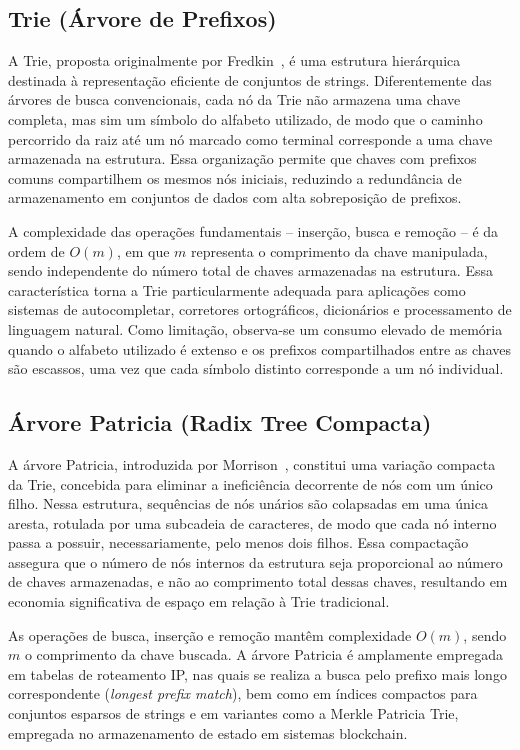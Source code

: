 \documentclass[conference]{IEEEtran}
\begin{document}
\subsection{Trie (Árvore de Prefixos)}

A Trie, proposta originalmente por Fredkin~\cite{fredkin1960}, é uma estrutura hierárquica destinada à representação eficiente de conjuntos de strings. Diferentemente das árvores de busca convencionais, cada nó da Trie não armazena uma chave completa, mas sim um símbolo do alfabeto utilizado, de modo que o caminho percorrido da raiz até um nó marcado como terminal corresponde a uma chave armazenada na estrutura. Essa organização permite que chaves com prefixos comuns compartilhem os mesmos nós iniciais, reduzindo a redundância de armazenamento em conjuntos de dados com alta sobreposição de prefixos.

A complexidade das operações fundamentais -- inserção, busca e remoção -- é da ordem de $O(m)$, em que $m$ representa o comprimento da chave manipulada, sendo independente do número total de chaves armazenadas na estrutura. Essa característica torna a Trie particularmente adequada para aplicações como sistemas de autocompletar, corretores ortográficos, dicionários e processamento de linguagem natural. Como limitação, observa-se um consumo elevado de memória quando o alfabeto utilizado é extenso e os prefixos compartilhados entre as chaves são escassos, uma vez que cada símbolo distinto corresponde a um nó individual.

\subsection{Árvore Patricia (Radix Tree Compacta)}

A árvore Patricia, introduzida por Morrison~\cite{morrison1968}, constitui uma variação compacta da Trie, concebida para eliminar a ineficiência decorrente de nós com um único filho. Nessa estrutura, sequências de nós unários são colapsadas em uma única aresta, rotulada por uma subcadeia de caracteres, de modo que cada nó interno passa a possuir, necessariamente, pelo menos dois filhos. Essa compactação assegura que o número de nós internos da estrutura seja proporcional ao número de chaves armazenadas, e não ao comprimento total dessas chaves, resultando em economia significativa de espaço em relação à Trie tradicional.

As operações de busca, inserção e remoção mantêm complexidade $O(m)$, sendo $m$ o comprimento da chave buscada. A árvore Patricia é amplamente empregada em tabelas de roteamento IP, nas quais se realiza a busca pelo prefixo mais longo correspondente (\textit{longest prefix match}), bem como em índices compactos para conjuntos esparsos de strings e em variantes como a Merkle Patricia Trie, empregada no armazenamento de estado em sistemas blockchain.
\end{document}
